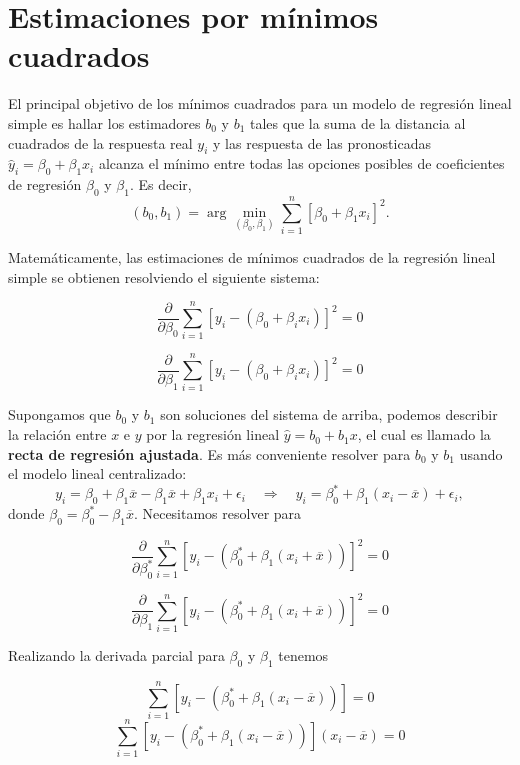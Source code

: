 \section{Estimaciones por mínimos cuadrados}
El principal objetivo de los mínimos cuadrados para un modelo de regresión lineal simple es hallar los estimadores $b_0$ y $b_1$ tales que la suma de la distancia al cuadrados de la respuesta real $y_i$ y las respuesta de las pronosticadas $\hat{y}_i=\beta_0+\beta_1x_i$ alcanza el mínimo entre todas las opciones posibles de coeficientes de regresión $\beta_0$ y $\beta_1$. Es decir,
$$(b_0,b_1)=\arg \min_{(\beta_0,\beta_1)}\sum_{i=1}^n \left[\beta_0+\beta_1 x_i\right]^2.$$

Matemáticamente, las estimaciones de mínimos cuadrados de la regresión lineal simple se obtienen resolviendo el siguiente sistema:

\begin{equation}
    \dfrac{\partial}{\partial\beta_0}\sum_{i=1}^n \left[y_i-\left(\beta_0+\beta_ix_i\right)\right]^2=0
\end{equation}

\begin{equation}
    \dfrac{\partial}{\partial\beta_1}\sum_{i=1}^n \left[y_i-\left(\beta_0+\beta_ix_i\right)\right]^2=0
\end{equation}
\vspace{0.5cm}

Supongamos que $b_0$ y $b_1$ son soluciones del sistema de arriba, podemos describir la relación entre $x$ e $y$ por la regresión lineal $\hat{y}=b_0+b_1x$, el cual es llamado la \textbf{recta de regresión ajustada}. Es más conveniente resolver para $b_0$ y $b_1$ usando el modelo lineal centralizado:
$$y_i= \beta_0+\beta_1\overline{x}-\beta_1\overline{x}+\beta_1x_i+\epsilon_i \quad \Rightarrow \quad y_i=\beta_0^* + \beta_1(x_i-\overline{x})+\epsilon_i,$$
donde $\beta_0=\beta_0^*-\beta_1\overline{x}$. Necesitamos resolver para

$$\dfrac{\partial}{\partial\beta_0^*}\sum_{i=1}^n \left[y_i-\left(\beta_0^*+\beta_1(x_i+\overline{x})\right)\right]^2=0$$

$$\dfrac{\partial}{\partial\beta_1}\sum_{i=1}^n \left[y_i-\left(\beta_0^*+\beta_1(x_i+\overline{x})\right)\right]^2=0$$

Realizando la derivada parcial para $\beta_0$ y $\beta_1$ tenemos

$$\sum_{i=1}^n \left[y_i-(\beta_0^* + \beta_1(x_i-\overline{x}))\right]=0$$
$$\sum_{i=1}^n \left[y_i-(\beta_0^* + \beta_1(x_i-\overline{x}))\right](x_i-\overline{x})=0$$


